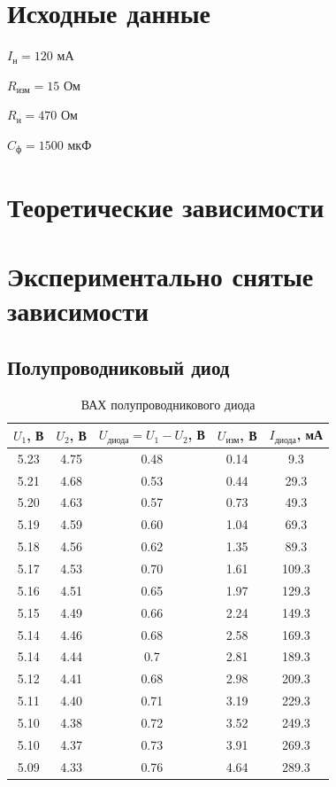 \section{Исходные данные}

$I_\text{н} = 120$ мА

$R_\text{изм} = 15$ Ом

$R_\text{н} = 470$ Ом

$C_\text{ф} = 1500$ мкФ

\section{Теоретические зависимости}



\section{Экспериментально снятые зависимости}

\subsection{Полупроводниковый диод}

\begin{table}[H]
	\begin{center}
	\caption{ВАХ полупроводникового диода}
	\def\arraystretch{1.2}
		\begin{tabular}{|c|c|c|c|c|}
		\hline 
		$U_1$, В & $U_2$, В & $U_\text{диода} = U_1 - U_2$, В & $U_\text{изм}$, В & $I_\text{диода}$, мА \\ 
		\hline 
		5.23 & 4.75 & 0.48 & 0.14 & 9.3 \\ 
		\hline 
		5.21 & 4.68 & 0.53 & 0.44 & 29.3 \\ 
		\hline 
		5.20 & 4.63 & 0.57 & 0.73 & 49.3 \\ 
		\hline 
		5.19 & 4.59 & 0.60 & 1.04 & 69.3 \\ 
		\hline 
		5.18 & 4.56 & 0.62 & 1.35 & 89.3 \\ 
		\hline 
		5.17 & 4.53 & 0.70 & 1.61 & 109.3 \\ 
		\hline 
		5.16 & 4.51 & 0.65 & 1.97 & 129.3 \\ 
		\hline 
		5.15 & 4.49 & 0.66 & 2.24 & 149.3 \\ 
		\hline 
		5.14 & 4.46 & 0.68 & 2.58 & 169.3 \\ 
		\hline 
		5.14 & 4.44 & 0.7 & 2.81 & 189.3 \\ 
		\hline 
		5.12 & 4.41 & 0.68 & 2.98 & 209.3 \\ 
		\hline 
		5.11 & 4.40 & 0.71 & 3.19 & 229.3 \\ 
		\hline 
		5.10 & 4.38 & 0.72 & 3.52 & 249.3 \\ 
		\hline 
		5.10 & 4.37 & 0.73 & 3.91 & 269.3 \\ 
		\hline 
		5.09 & 4.33 & 0.76 & 4.64 & 289.3 \\ 
		\hline 
		\end{tabular} 
		\label{tab:5:1}
	\end{center}
\end{table}

